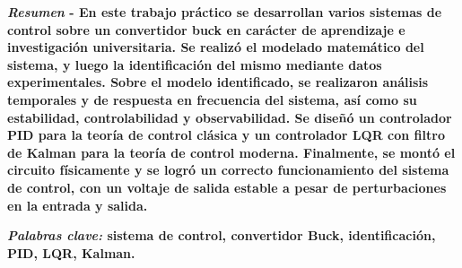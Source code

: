\justifying

\textbf{\textit{Resumen} - En este trabajo práctico se desarrollan varios sistemas de control sobre un convertidor buck en carácter de aprendizaje e investigación universitaria.
Se realizó el modelado matemático del sistema, y luego la identificación del mismo mediante datos experimentales. Sobre el modelo identificado,
se realizaron análisis temporales y de respuesta en frecuencia del sistema, así como su estabilidad, controlabilidad y observabilidad. Se 
diseñó un controlador PID para la teoría de control clásica y un controlador LQR con filtro de Kalman para la teoría de control moderna. 
Finalmente, se montó el circuito físicamente y se logró un correcto funcionamiento del sistema de control, con un voltaje de salida
estable a pesar de perturbaciones en la entrada y salida.}
\vspace{-0.15cm}

\noindent \textbf{\textit{Palabras clave:} sistema de control, convertidor Buck, identificación, PID, LQR, Kalman.}